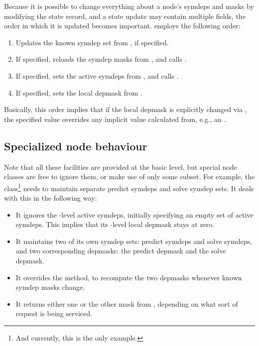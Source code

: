   Because it is possible to change everything about a node's symdeps and masks
  by modifying the state record, and a state update may contain multiple
  fields, the order in which it is updated becomes important.
   employs the following order:

  \begin{enumerate}
  
  \item Updates the known symdep set from , if specified.
  
  \item If specified, reloads the symdep masks from , and
    calls .
    
  \item If specified, sets the active symdeps from , and
    calls .
    
  \item If specified, sets the local depmask from .
  
  \end{enumerate}
  
  Basically, this order implies that if the local depmask is explicitly changed
  via , the specified value overrides any implicit value
  calculated from, e.g., an .
  
\subsection{Specialized node behaviour}  
  
  Note that all these facilities are provided at the basic  level, but
  special node classes are free to ignore them, or make use of only some
  subset. For example, the  class\footnote{And currently, this is the
  only example.} needs to maintain separate predict symdeps and solve symdep
  sets. It deals with this in the following way:

  \begin{itemize}
  
  \item It ignores the -level active symdeps, initially specifying an
    empty set of active symdeps. This implies that its -level local
    depmask stays at zero.

  \item It maintains two of its own symdep sets: predict symdeps and solve
    symdeps, and two corresponding depmasks: the predict depmask and the solve
    depmask.
    
  \item It overrides the  method, to recompute the two
    depmasks whenever known symdep masks change.
    
  \item It returns either one or the other mask from , depending
    on what sort of request is being serviced.

  \end{itemize}
  
